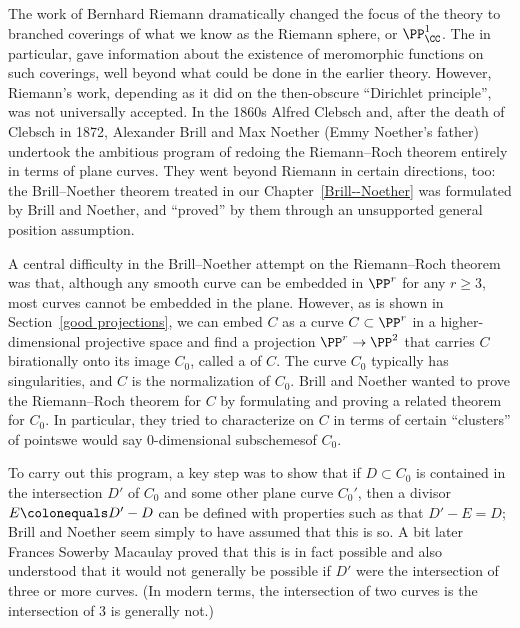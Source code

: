 The work of Bernhard Riemann dramatically changed the focus of the
%
theory to branched coverings of   
what we know as the Riemann sphere, or $\PP^1_\CC$.
The 
%
in particular, gave
information about the existence of meromorphic functions on such
coverings, well beyond what could be done in the earlier theory.
However, Riemann's work, depending as it did on the then-obscure
%
``Dirichlet principle'', was not universally accepted. In the 1860s
%
%
%
Alfred Clebsch and, after the death of Clebsch  in 1872, Alexander
Brill and Max Noether (Emmy Noether's father) undertook the ambitious
program of redoing the Riemann--Roch theorem entirely in terms of
plane curves. They went beyond Riemann in certain directions, too: the
Brill--Noether theorem treated in our Chapter~\ref{Brill--Noether} was
formulated by Brill and Noether, and ``proved'' by them through an
unsupported general position assumption.

A central difficulty in the Brill--Noether attempt on the Riemann--Roch theorem was that,
although any smooth curve can be embedded in $\PP^r$ for any $r \geq 3$, most curves cannot be embedded in the plane. 
However, as is shown in Section~\ref{good projections}, we can embed
$C$ as a curve $ C \subset \PP^r$ in a higher-dimensional projective
space and find a projection $\PP^r \to \PP^2$ that carries $C$
birationally onto its image $C_0$, called a 
%
of $C$. The
curve $C_0$ typically has singularities, and $C$ is the normalization
of $C_0$. Brill and Noether wanted to prove the Riemann--Roch theorem
for $C$ by formulating and proving a related theorem for $C_0$. In
particular, they tried to characterize 
%
%
on $C$ in terms of certain ``clusters'' of points\emdash we would say
0-dimensional subschemes\emdash of $C_0$.  

To carry out this program, a key step was to show that if $D\subset C_0$ is contained in the intersection
$D'$ of $C_0$ and some other plane curve $C_0'$, then a divisor 
$E \colonequals D'-D$ can be defined with properties such as that $D'-E = D$;
Brill and Noether seem simply to have assumed that this is so. A bit
%
later Frances Sowerby Macaulay proved that this is in fact possible
and also understood that it would not generally be possible if $D'$
were the intersection of three or more curves.
(In modern terms, the intersection of two curves is 
%
the intersection of 3 is generally not.)

